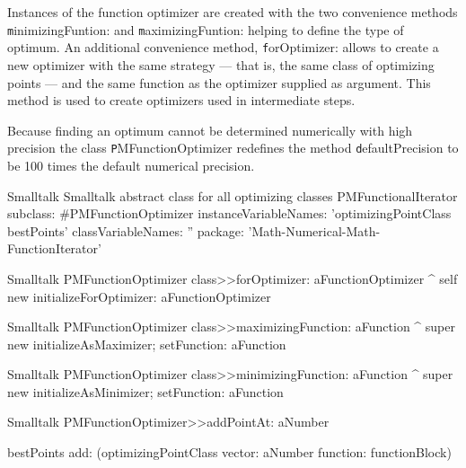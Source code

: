 Instances of the function optimizer are created with the two
convenience methods {\texttt minimizingFuntion:} and {\texttt
maximizingFuntion:} helping to define the type of optimum. An
additional convenience method, {\texttt forOptimizer:} allows to
create a new optimizer with the same strategy --- that is, the
same class of optimizing points --- and the same function as the
optimizer supplied as argument.
This method is used to create optimizers used in intermediate steps.

Because finding an optimum cannot be determined numerically with
high precision \cite{Press} the class {\texttt PMFunctionOptimizer}
redefines the method {\texttt defaultPrecision} to be 100 times the
default numerical precision.


\begin{listing}[label=ls:optimizerAbstract]{Smalltalk}
 {Smalltalk abstract class for all optimizing classes}
PMFunctionalIterator subclass: #PMFunctionOptimizer
   instanceVariableNames: 'optimizingPointClass bestPoints'
   classVariableNames: ''
   package: 'Math-Numerical-Math-FunctionIterator'
\end{listing}

\begin{displaycode}{Smalltalk}
PMFunctionOptimizer class>>defaultPrecision}
   ^ super defaultPrecision * 100
\end{displaycode}
  
\begin{displaycode}{Smalltalk}
PMFunctionOptimizer class>>forOptimizer: aFunctionOptimizer
   ^ self new initializeForOptimizer: aFunctionOptimizer
\end{displaycode}
  
\begin{displaycode}{Smalltalk}    
PMFunctionOptimizer class>>maximizingFunction: aFunction
   ^ super new initializeAsMaximizer; setFunction: aFunction
\end{displaycode}

\begin{displaycode}{Smalltalk}
PMFunctionOptimizer class>>minimizingFunction: aFunction
   ^ super new initializeAsMinimizer; setFunction: aFunction
\end{displaycode}

\begin{displaycode}{Smalltalk}
PMFunctionOptimizer>>addPointAt: aNumber

    bestPoints add: (optimizingPointClass vector: aNumber
                                        function: functionBlock)
\end{displaycode}

